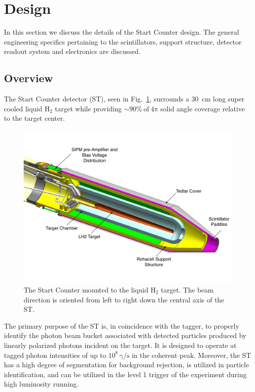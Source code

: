 \section{Design} \label{sec:design}

In this section we discuss the details of the \gx{} Start Counter design.  The general engineering specifics pertaining to the scintillators, support structure, detector readout system and electronics are discussed.

\subsection{Overview} \label{sec:design_overview}
The Start Counter detector (ST), seen in Fig.~\ref{fig:sttargetiso}, surrounds a 30~cm long super cooled liquid $\mathrm{H_{2}}$ target while providing $\sim 90 \%\ \mathrm{of\ 4 \pi}$ solid angle coverage relative to the target center.
	\begin{figure}[!htb]
		\centering
		\includegraphics[width=1.0\columnwidth]{design/figs/start_counter_all.pdf}
		\caption{The \gx{} Start Counter mounted to the liquid $\mathrm{H_2}$ target.  The beam direction is oriented from left to right down the central axis of the ST.}
		\label{fig:sttargetiso}
	\end{figure}
The primary purpose of the ST is, in coincidence with the tagger, to properly identify the photon beam bucket associated with detected particles produced by linearly polarized photons incident on the target. It is designed to operate at tagged photon intensities of up to $10^{8}\,\mathrm{\gamma/s}$ in the coherent peak.  Moreover, the ST has a high degree of segmentation for background rejection, is utilized in particle identification, and can be utilized in the level 1 trigger of the \gx{} experiment during high luminosity running\cite{pooser16}\cite{somov_trig_talk}.

